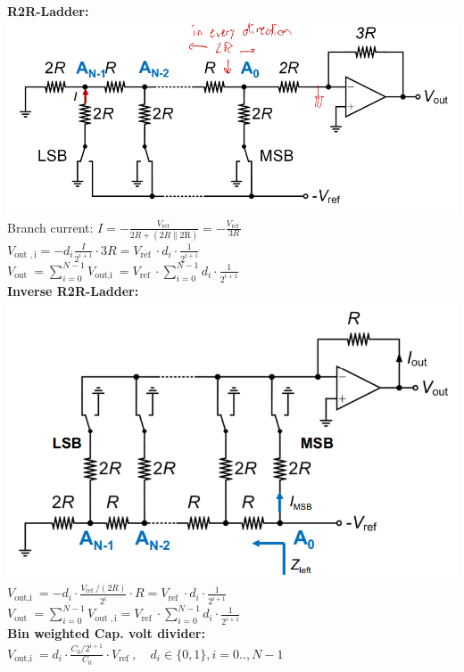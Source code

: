 \documentclass[5pt]{article}
\begin{document}
\begin{multicols*}{4}
\textbf{R2R-Ladder:}\\
\includegraphics[width=\columnwidth]{images/dac_r2r_ladder.png}
Branch current: $ I=-\frac{V_{\text {ref }}}{2 R+(2 R \| 2 \mathrm{R})}=-\frac{V_{\text {ref }}}{3 R} $\\
$ V_{\text {out }, \mathrm{i}}=-d_{i} \frac{I}{2^{i+1}} \cdot 3 R=V_{\text {ref }} \cdot d_{i} \cdot \frac{1}{2^{i+1}} $\\
$ V_{\text {out }}=\sum_{i=0}^{N-1} V_{\text {out,i }}=V_{\text {ref }} \cdot \sum_{i=0}^{N-1} d_{i} \cdot \frac{1}{2^{i+1}} $\\
\textbf{Inverse R2R-Ladder:}\\
\includegraphics[width=\columnwidth]{images/dac_inverse_r2r.png}\\
$ V_{\text {out,i }}=-d_{i} \cdot \frac{V_{\text {ref }} /(2 R)}{2^{i}} \cdot R=V_{\text {ref }} \cdot d_{i} \cdot \frac{1}{2^{i+1}} $\\
$ V_{\text {out }}=\sum_{i=0}^{N-1} V_{\text {out }, \mathrm{i}}=V_{\text {ref }} \cdot \sum_{i=0}^{N-1} d_{i} \cdot \frac{1}{2^{i+1}} $\\
\textbf{Bin weighted Cap. volt divider:}\\
$ V_{\text {out,i }}=d_{i} \cdot \frac{C_{0} / 2^{i+1}}{C_{0}} \cdot V_{\text {ref }}, \quad d_{i} \in\{0,1\}, i=0 . ., N-1 $\\

\end{multicols*}
\end{document}
